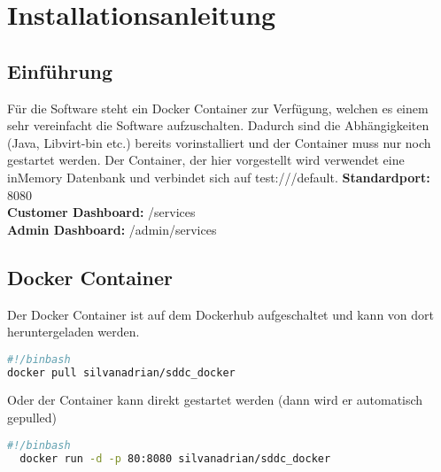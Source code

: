 \chapter{Installationsanleitung}
\section{Einführung}
Für die Software steht ein Docker Container zur Verfügung, welchen es einem sehr 
vereinfacht die Software aufzuschalten.
Dadurch sind die Abhängigkeiten (Java, Libvirt-bin etc.) bereits vorinstalliert 
und der Container muss nur noch gestartet werden.
Der Container, der hier vorgestellt wird verwendet eine inMemory Datenbank und verbindet sich auf 
test:///default.
\newline
\textbf{Standardport:} 8080
\\
\textbf{Customer Dashboard:} /services
\\
\textbf{Admin Dashboard:} /admin/services

\section{Docker Container}
Der Docker Container ist auf dem Dockerhub aufgeschaltet und kann von dort 
heruntergeladen werden.
\begin{lstlisting}[style=BASH,language=bash,caption={Pull Docker Container}]
#!/binbash
docker pull silvanadrian/sddc_docker
\end{lstlisting}
Oder der Container kann direkt gestartet werden (dann wird er automatisch gepulled)

\begin{lstlisting}[style=Bash,language=bash,caption={Run Docker Container}]
  #!/binbash
  docker run -d -p 80:8080 silvanadrian/sddc_docker
\end{lstlisting}